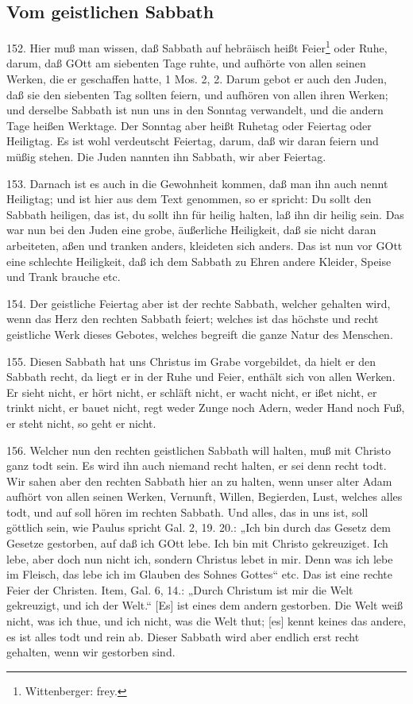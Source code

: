 \subsection{Vom geistlichen Sabbath}

152. Hier muß man wissen, daß Sabbath auf hebräisch heißt Feier\footnote{Wittenberger: frey.} oder Ruhe, darum, daß GOtt am siebenten Tage ruhte, und aufhörte von allen seinen Werken, die er geschaffen hatte, 1 Mos. 2, 2. Darum gebot er auch den Juden, daß sie den siebenten Tag sollten feiern, und aufhören von allen ihren Werken; und derselbe Sabbath ist nun uns in den Sonntag verwandelt, und die andern Tage heißen Werktage. Der Sonntag aber heißt Ruhetag oder Feiertag oder Heiligtag. Es ist wohl verdeutscht Feiertag, darum, daß wir daran feiern und müßig stehen. Die Juden nannten ihn Sabbath, wir aber Feiertag.

153. Darnach ist es auch in die Gewohnheit kommen, daß man ihn auch nennt Heiligtag; und ist hier aus dem Text genommen, so er spricht: Du sollt den Sabbath heiligen, das ist, du sollt ihn für heilig halten, laß ihn dir heilig sein. Das war nun bei den Juden eine grobe, äußerliche Heiligkeit, daß sie nicht daran arbeiteten, aßen und tranken anders, kleideten sich anders. Das ist nun vor GOtt eine schlechte Heiligkeit, daß ich dem Sabbath zu Ehren andere Kleider, Speise und Trank brauche etc.

154. Der geistliche Feiertag aber ist der rechte Sabbath, welcher gehalten wird, wenn das Herz den rechten Sabbath feiert; welches ist das höchste und recht geistliche Werk dieses Gebotes, welches begreift die ganze Natur des Menschen.

155. Diesen Sabbath hat uns Christus im Grabe vorgebildet, da hielt er den Sabbath recht, da liegt er in der Ruhe und Feier, enthält sich von allen Werken. Er sieht nicht, er hört nicht, er schläft nicht, er wacht nicht, er ißet nicht, er trinkt nicht, er bauet nicht, regt weder Zunge noch Adern, weder Hand noch Fuß, er steht nicht, so geht er nicht.

156. Welcher nun den rechten geistlichen Sabbath will halten, muß mit Christo ganz todt sein. Es wird ihn auch niemand recht halten, er sei denn recht todt. Wir sahen aber den rechten Sabbath hier an zu halten, wenn unser alter Adam aufhört von allen seinen Werken, Vernunft, Willen, Begierden, Lust, welches alles todt, und auf soll hören im rechten Sabbath. Und alles, das in uns ist, soll göttlich sein, wie Paulus spricht Gal. 2, 19. 20.: „Ich bin durch das Gesetz dem Gesetze gestorben, auf daß ich GOtt lebe. Ich bin mit Christo gekreuziget. Ich lebe, aber doch nun nicht ich, sondern Christus lebet in mir. Denn was ich lebe im Fleisch, das lebe ich im Glauben des Sohnes Gottes“ etc. Das ist eine rechte Feier der Christen. Item, Gal. 6, 14.: „Durch Christum ist mir die Welt gekreuzigt, und ich der Welt.“ [Es] ist eines dem andern gestorben. Die Welt weiß nicht, was ich thue, und ich nicht, was die Welt thut; [es] kennt keines das andere, es ist alles todt und rein ab. Dieser Sabbath wird aber endlich erst recht gehalten, wenn wir gestorben sind.


